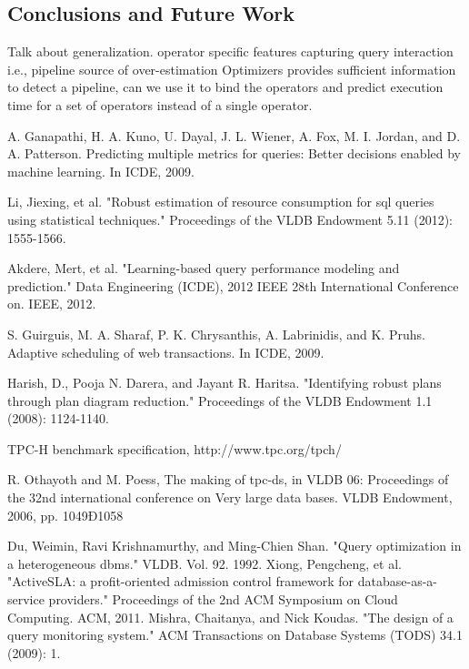 \documentclass{article}
\begin{document}
\begin{multicols}{2}
	\section{Conclusions and Future Work}
	Talk about generalization. 
	operator specific features
	capturing query interaction i.e., pipeline source of over-estimation
	Optimizers provides sufficient information to detect a pipeline,
	 can we use it to bind the operators and predict execution time 
	 for a set of operators instead of a single operator.
	
	\begin{thebibliography}{9}
	A. Ganapathi, H. A. Kuno, U. Dayal, J. L. Wiener, A. Fox, M. I. Jordan,
	and D. A. Patterson. Predicting multiple metrics for queries: Better
	decisions enabled by machine learning. In ICDE, 2009.
	
	Li, Jiexing, et al. "Robust estimation of resource consumption for sql queries using statistical 			techniques." Proceedings of the VLDB Endowment 5.11 (2012): 1555-1566.
	
	Akdere, Mert, et al. "Learning-based query performance modeling and prediction." Data Engineering 			(ICDE), 2012 IEEE 28th International Conference on. IEEE, 2012.	
	
     S. Guirguis, M. A. Sharaf, P. K. Chrysanthis, A. Labrinidis, and
	K. Pruhs. Adaptive scheduling of web transactions. In ICDE, 2009.
	
	Harish, D., Pooja N. Darera, and Jayant R. Haritsa. "Identifying robust plans through plan diagram 			reduction." Proceedings of the VLDB Endowment 1.1 (2008): 1124-1140.

	TPC-H benchmark specification, http://www.tpc.org/tpch/
	
	R. Othayoth and M. Poess, The making of tpc-ds, in VLDB
	06: Proceedings of the 32nd international conference on Very
	large data bases. VLDB Endowment, 2006, pp. 1049Ð1058
	
	Du, Weimin, Ravi Krishnamurthy, and Ming-Chien Shan. "Query optimization in a heterogeneous dbms." 		VLDB. Vol. 92. 1992.
	Xiong, Pengcheng, et al. "ActiveSLA: a profit-oriented admission control framework for database-as-a-		service providers." Proceedings of the 2nd ACM Symposium on Cloud Computing. ACM, 2011.	
	Mishra, Chaitanya, and Nick Koudas. "The design of a query monitoring system." ACM Transactions on 		Database Systems (TODS) 34.1 (2009): 1.
	
	\end{thebibliography}
	\end{multicols}
\end{document}
